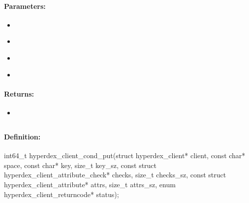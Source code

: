 \paragraph{Parameters:}
\begin{itemize}[noitemsep]
\item {}\\

\item {}\\

\item {}\\

\item {}\\

\end{itemize}

\paragraph{Returns:}
\begin{itemize}[noitemsep]
\item {}\\

\end{itemize}

\pagebreak
\subsection{}
\label{api:c:cond_put}


\paragraph{Definition:}
\begin{ccode}
int64_t hyperdex_client_cond_put(struct hyperdex_client* client,
        const char* space,
        const char* key, size_t key_sz,
        const struct hyperdex_client_attribute_check* checks, size_t checks_sz,
        const struct hyperdex_client_attribute* attrs, size_t attrs_sz,
        enum hyperdex_client_returncode* status);
\end{ccode}

